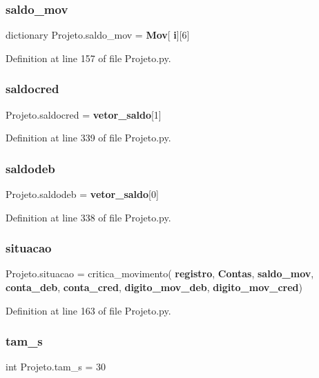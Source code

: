 \subsubsection{saldo\_mov}
{\footnotesize\ttfamily dictionary Projeto.\+saldo\+\_\+mov = \textbf{ Mov}[\textbf{ i}][6]}



Definition at line 157 of file Projeto.\+py.

\mbox{\label{namespace_projeto_ac7a37eba244f854e1cf1c9bebb6ebb35}} 
\subsubsection{saldocred}
{\footnotesize\ttfamily Projeto.\+saldocred = \textbf{ vetor\+\_\+saldo}[1]}



Definition at line 339 of file Projeto.\+py.

\mbox{\label{namespace_projeto_a6034640d784bdf781fd5b618d62d4e08}} 
\subsubsection{saldodeb}
{\footnotesize\ttfamily Projeto.\+saldodeb = \textbf{ vetor\+\_\+saldo}[0]}



Definition at line 338 of file Projeto.\+py.

\mbox{\label{namespace_projeto_a242b1fb2920deef2b1c483aa8ebbb8ab}} 
\subsubsection{situacao}
{\footnotesize\ttfamily Projeto.\+situacao = critica\+\_\+movimento(\textbf{ registro}, \textbf{ Contas}, \textbf{ saldo\+\_\+mov}, \textbf{ conta\+\_\+deb}, \textbf{ conta\+\_\+cred}, \textbf{ digito\+\_\+mov\+\_\+deb}, \textbf{ digito\+\_\+mov\+\_\+cred})}



Definition at line 163 of file Projeto.\+py.

\mbox{\label{namespace_projeto_a4ee95fe18eba7d6abead98850d790d65}} 
\subsubsection{tam\_s}
{\footnotesize\ttfamily int Projeto.\+tam\+\_\+s = 30}




